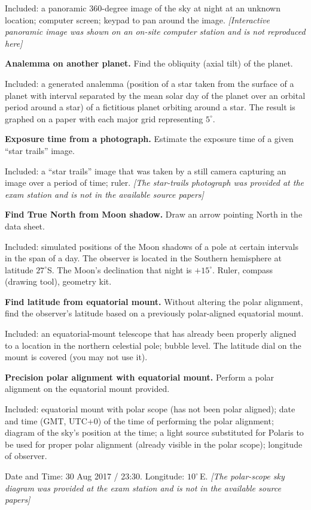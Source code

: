 \begin{description}
  Included: a panoramic 360-degree image of the sky at night at an unknown
  location; computer screen; keypad to pan around the image.
  \textit{[Interactive panoramic image was shown on an on-site computer station and is not reproduced here]}

\item[(P3)] \textbf{Analemma on another planet.} Find the obliquity (axial
  tilt) of the planet.

  Included: a generated analemma (position of a star taken from the surface of
  a planet with interval separated by the mean solar day of the planet over an
  orbital period around a star) of a fictitious planet orbiting around a star.
  The result is graphed on a paper with each major grid representing
  $5^\circ$.

\item[(P4)] \textbf{Exposure time from a photograph.} Estimate the exposure
  time of a given ``star trails'' image.

  Included: a ``star trails'' image that was taken by a still camera capturing
  an image over a period of time; ruler.
  \textit{[The star-trails photograph was provided at the exam station and is not in the available source papers]}

\item[(P5)] \textbf{Find True North from Moon shadow.} Draw an arrow pointing
  North in the data sheet.

  Included: simulated positions of the Moon shadows of a pole at certain
  intervals in the span of a day. The observer is located in the Southern
  hemisphere at latitude $27^\circ$S. The Moon's declination that night is
  $+15^\circ$. Ruler, compass (drawing tool), geometry kit.

\item[(P6)] \textbf{Find latitude from equatorial mount.} Without altering the
  polar alignment, find the observer's latitude based on a previously
  polar-aligned equatorial mount.

  Included: an equatorial-mount telescope that has already been properly
  aligned to a location in the northern celestial pole; bubble level. The
  latitude dial on the mount is covered (you may not use it).

\item[(P7)] \textbf{Precision polar alignment with equatorial mount.} Perform
  a polar alignment on the equatorial mount provided.

  Included: equatorial mount with polar scope (has not been polar aligned);
  date and time (GMT, UTC+0) of the time of performing the polar alignment;
  diagram of the sky's position at the time; a light source substituted for
  Polaris to be used for proper polar alignment (already visible in the polar
  scope); longitude of observer.

  Date and Time: 30 Aug 2017 / 23:30. \quad Longitude: $10^\circ$\,E.
  \textit{[The polar-scope sky diagram was provided at the exam station and is not in the available source papers]}
\end{description}

